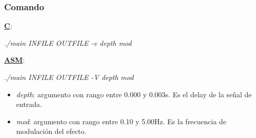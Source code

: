 \subsubsection{Comando}
\label{subsec:desarrollo-vibrato-call}

\underline{\textbf{C}}:
\begin{center}
 \textit{./main INFILE OUTFILE -v depth mod}
\end{center}

\underline{\textbf{ASM}}:
\begin{center}
 \textit{./main INFILE OUTFILE -V depth mod}
\end{center}

\begin{itemize}
 \item \textit{depth}: argumento con rango entre 0.000 y 0.003s. Es el delay de la señal de entrada.
 \item \textit{mod}: argumento con rango entre 0.10 y 5.00Hz. Es la frecuencia de modulación del efecto.
\end{itemize}
 
